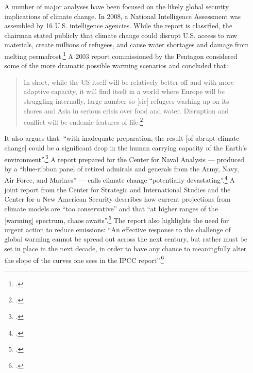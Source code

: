 A number of major analyses have been focused on the likely global security implications of climate change.
In 2008, a National Intelligence Assessment was assembled by 16 U.S. intelligence agencies.
While the report is classified, the chairman stated publicly that climate change could disrupt U.S. access to raw materials, create millions of refugees, and cause water shortages and damage from melting permafrost.\footcite[][]{Craven}
A 2003 report commissioned by the Pentagon considered some of the more dramatic possible warming scenarios and concluded that:
\begin{quote}
In short, while the US itself will be relatively better off and with more adaptive capacity, it will find itself in a world where Europe will be struggling internally, large number so [sic] refugees washing up on its shores and Asia in serious crisis over food and water. Disruption and conflict will be endemic features of life.\footcite[][p. 22]{AbruptCCScenario}
\end{quote}
It also argues that: ``with inadequate preparation, the result [of abrupt climate change] could be a significant drop in the human carrying capacity of the Earth’s environment''.\footcite[][p. 1]{AbruptCCScenario}
A report prepared for the Center for Naval Analysis --- produced by a ``blue-ribbon panel of retired admirals and generals from the Army, Navy, Air Force, and Marines'' --- calls climate change ``potentially devastating''.\footcite[][p. 3]{NationalSecurityCC}
A joint report from the Center for Strategic and International Studies and the Center for a New American Security describes how current projections from climate models are ``too conservative'' and that ``at higher ranges of the [warming] spectrum, chaos awaits''.\footcite[][p. 78]{AgeOfConsequences}
The report also highlights the need for urgent action to reduce emissions: ``An effective response to the challenge of global warming cannot be spread out across the next century, but rather must be set in place in the next decade, in order to have any chance to meaningfully alter the slope of the curves one sees in the IPCC report''.\footcite[][p. 78]{AgeOfConsequences}



